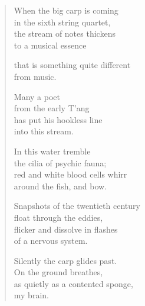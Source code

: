 {\setlength{\stanzaskip}{0.5em}


\vspace*{-0.5\onelineskip}
\begin{verse}

When the big carp is coming\\
in the sixth string quartet,\\
the stream of notes thickens\\
to a musical essence

that is something quite different\\
from music.

Many a poet\\
from the early T'ang\\
has put his hookless line\\
into this stream.

In this water tremble\\
the cilia of psychic fauna;\\
red and white blood cells whirr\\
around the fish, and bow.

Snapshots of the twentieth century\\
float through the eddies,\\
flicker and dissolve in flashes\\
of a nervous system.

Silently the carp glides past.\\
On the ground breathes,\\
as quietly as a contented sponge,\\
my brain.

\end{verse}

}

